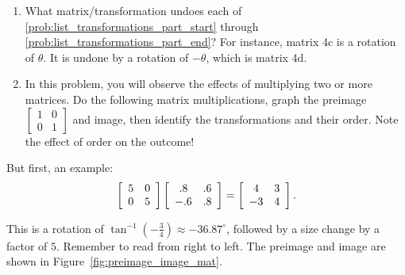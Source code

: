 \documentclass[../gatm.tex]{subfiles}
\begin{document}
\begin{enumerate}
\begin{enumerate}
\end{enumerate}
\item What matrix/transformation undoes each of \ref{prob:list_transformations_part_start} through \ref{prob:list_transformations_part_end}? For instance, matrix 4c is a rotation of $\theta$. It is undone by a rotation of $-\theta$, which is matrix 4d.
\item In this problem, you will observe the effects of multiplying two or more matrices. Do the following matrix multiplications, graph the preimage $\left[\begin{array}{cc}1 & 0 \\ 0 & 1\end{array}\right]$ and image, then identify the transformations and their order. Note the effect of order on the outcome!
\setcounter{bruh_count}{\value{enumi}}
\end{enumerate}

\noindent But first, an example:
$$\left[\begin{array}{cc} 5 & 0 \\ 0 & 5 \end{array}\right]\left[\begin{array}{cc} .8 & .6 \\ -.6 & .8 \end{array}\right]=\left[\begin{array}{cc} 4 & 3 \\ -3 & 4 \end{array}\right].$$

\noindent This is a rotation of $\tan^{-1}\left(-\frac{3}{4}\right)\approx-36.87^\circ$, followed by a size change by a factor of $5$. Remember to read from right to left. The preimage and image are shown in Figure~\ref{fig:preimage_image_mat}.

\end{document}

